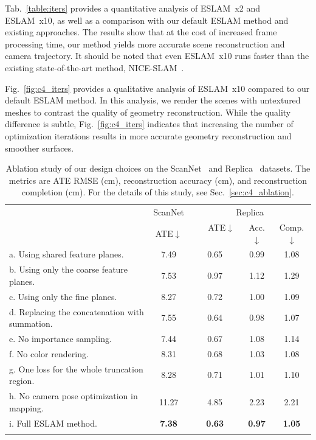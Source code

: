Tab.~\ref{table:iters} provides a quantitative analysis of ESLAM~x2 and ESLAM~x10, as well as a comparison with our default ESLAM method and existing approaches. The results show that at the cost of increased frame processing time, our method yields more accurate scene reconstruction and camera trajectory. It should be noted that even ESLAM~x10 runs faster than the existing state-of-the-art method, NICE-SLAM~\cite{zhu2022nice}.

Fig.~\ref{fig:c4_iters} provides a qualitative analysis of ESLAM~x10 compared to our default ESLAM method. In this analysis, we render the scenes with untextured meshes to contrast the quality of geometry reconstruction. While the quality difference is subtle, Fig.~\ref{fig:c4_iters} indicates that increasing the number of optimization iterations results in more accurate geometry reconstruction and smoother surfaces.

\begin{table}[t]
    \begin{center}
        \begin{tabular}{l|c|ccc}
            \Xhline{2\arrayrulewidth}
            \multirow{2}{*}{Experiment} & \multicolumn{1}{c|}{ScanNet} &  \multicolumn{3}{c}{Replica}  \\
            
            & ATE$\downarrow$ & ~~~ATE$\downarrow$~~~ & Acc.$\downarrow$ & Comp.$\downarrow$ \\
    
            \hline
            a. Using shared feature planes. & \phantom{0}7.49 & 0.65 & 0.99 & 1.08 \\
            b. Using only the coarse feature planes. & \phantom{0}7.53 & 0.97 & 1.12 & 1.29 \\
            c. Using only the fine planes. & \phantom{0}8.27 & 0.72 & 1.00 & 1.09 \\
            d. Replacing the concatenation with summation. & \phantom{0}7.55 & 0.64 & 0.98 & 1.07 \\
            e. No importance sampling. & \phantom{0}7.44 & 0.67 & 1.08 & 1.14 \\
            f. No color rendering. & \phantom{0}8.31 & 0.68 & 1.03 & 1.08 \\
            g. One loss for the whole truncation region. & \phantom{0}8.28 & 0.71 & 1.01 & 1.10 \\
            h. No camera pose optimization in mapping. & 11.27 & 4.85 & 2.23 & 2.21 \\
            i. Full ESLAM method. & \phantom{0}\textbf{7.38} & \textbf{0.63} & \textbf{0.97} & \textbf{1.05} \\
    
            \Xhline{2\arrayrulewidth}
        \end{tabular}
    \end{center}
    \caption{Ablation study of our design choices on the ScanNet~\cite{dai2017scannet} and Replica~\cite{replica19arxiv} datasets. The metrics are ATE RMSE (cm), reconstruction accuracy (cm), and reconstruction completion (cm). For the details of this study, see Sec.~\ref{sec:c4_ablation}.}
    \label{table:ab_choices}
\end{table}

